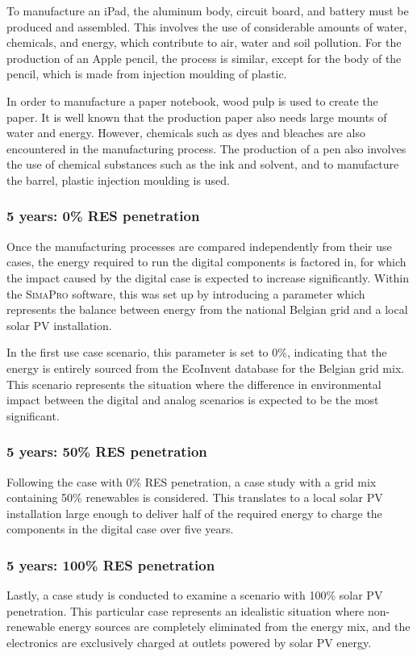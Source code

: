 To manufacture an iPad, the aluminum body, circuit board, and battery must be produced and assembled. This involves the use of considerable amounts of water, chemicals, and energy, which contribute to air, water and soil pollution. For the production of an Apple pencil, the process is similar, except for the body of the pencil, which is made from injection moulding of plastic. 

In order to manufacture a paper notebook, wood pulp is used to create the paper. It is well known that the production paper also needs large mounts of water and energy. However, chemicals such as dyes and bleaches are also encountered in the manufacturing process. The production of a pen also involves the use of chemical substances such as the ink and solvent, and to manufacture the barrel, plastic injection moulding is used. 

\subsubsection*{5 years: 0\% RES penetration}

Once the manufacturing processes are compared independently from their use cases, the energy required to run the digital components is factored in, for which the impact caused by the digital case is expected to increase significantly. Within the \textsc{SimaPro} software, this was set up by introducing a parameter which represents the balance between energy from the national Belgian grid and a local solar PV installation.

In the first use case scenario, this parameter is set to 0\%, indicating that the energy is entirely sourced from the EcoInvent database for the Belgian grid mix. This scenario represents the situation where the difference in environmental impact between the digital and analog scenarios is expected to be the most significant.

\subsubsection*{5 years: 50\% RES penetration}
Following the case with 0\% RES penetration, a case study with a grid mix containing 50\% renewables is considered. This translates to a local solar PV installation large enough to deliver half of the required energy to charge the components in the digital case over five years.

\subsubsection*{5 years: 100\% RES penetration}
Lastly, a case study is conducted to examine a scenario with 100\% solar PV penetration. This particular case represents an idealistic situation where non-renewable energy sources are completely eliminated from the energy mix, and the electronics are exclusively charged at outlets powered by solar PV energy.